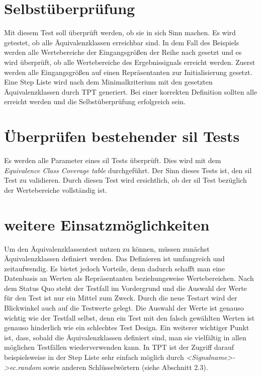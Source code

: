 \section*{Selbstüberprüfung}
Mit diesem Test soll überprüft werden, ob sie in sich Sinn machen. Es wird getestet, ob alle Äquivalenzklassen
erreichbar sind. In dem Fall des Beispiels werden alle Wertebereiche der Eingangsgrößen
der Reihe nach gesetzt und es wird überprüft, ob alle Wertebereiche des Ergebnissignals erreicht werden.
Zuerst werden alle Eingangsgrößen auf einen Repräsentanten zur Initialisierung gesetzt.
Eine Step Liste wird nach dem Minimalkriterium mit den gesetzten Äquivalenzklassen durch TPT generiert. 
Bei einer korrekten Definition sollten alle erreicht werden und die Selbstüberprüfung erfolgreich sein.
\section*{Überprüfen bestehender \ac{sil} Tests}
Es werden alle Parameter eines \ac{sil} Tests überprüft.
Dies wird mit dem \textit{Equivalence Class Coverage table} durchgeführt. Der Sinn dieses Tests ist,
den \ac{sil} Test zu validieren. Durch diesen Test wird ersichtlich, ob der \ac{sil} Test bezüglich
der Wertebereiche vollständig ist.
\section*{weitere Einsatzmöglichkeiten}
Um den Äquivalenzklassentest nutzen zu können, müssen zunächst Äquivalenzklassen definiert werden.
Das Definieren ist umfangreich und zeitaufwendig. Es bietet jedoch Vorteile, denn dadurch schafft man eine
Datenbasis an Werten als Repräsentanten beziehungsweise Wertebereichen. Nach dem Status Quo steht der Testfall
im Vordergrund und die Auswahl der Werte für den Test ist nur ein Mittel zum Zweck. Durch die neue Testart 
wird der Blickwinkel auch auf die Testwerte gelegt. Die Auswahl der Werte ist genauso wichtig wie
der Testfall selbst, denn ein Test mit den falsch gewählten Werten ist genauso hinderlich wie ein schlechtes Test Design.
Ein weiterer wichtiger Punkt ist, dass, sobald die Äquivalenzklassen definiert sind, man sie
vielfältig in allen möglichen Testfällen wiederverwenden kann. In TPT ist der Zugriff darauf beispielsweise
in der Step Liste sehr einfach
möglich durch \textit{<Signalname>->ec.random} sowie anderen Schlüsselwörtern (siehe Abschnitt 2.3).